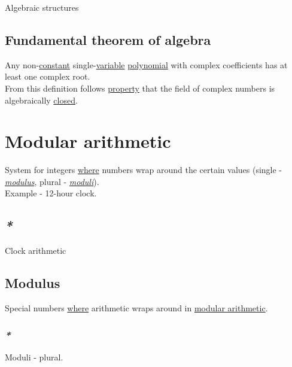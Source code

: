 \documentclass[a4paper,14pt,oneside]{book}
\begin{document}
\label{org011ad83}Algebraic structures\\

\subsection{\label{orgbf66151}Fundamental theorem of algebra}
\label{sec:orgc7f7489}
Any non-\hyperref[org378472e]{constant} single-\hyperref[org2a8e721]{variable} \hyperref[org46adc30]{polynomial} with complex coefficients has at least one complex root.\\

From this definition follows \hyperref[org49b84ac]{property} that the field of complex numbers is algebraically \hyperref[org194c6d7]{closed}.\\

\section{\label{orgf87d4cd}Modular arithmetic}
\label{sec:org1065b7b}
System for integers \hyperref[org12b3f26]{where} numbers wrap around the certain values (single - \emph{\hyperref[org9acab14]{modulus}}, plural - \emph{\hyperref[org7d51c03]{moduli}}).\\

Example - 12-hour clock.\\

\subsection{\emph{*}}
\label{sec:org63f3131}

\label{org0b78cbc}Clock arithmetic\\

\subsection{\label{org9acab14}Modulus}
\label{sec:org92c580f}
Special numbers \hyperref[org12b3f26]{where} arithmetic wraps around in \hyperref[orgf87d4cd]{modular arithmetic}.\\

\subsubsection{\emph{*}}
\label{sec:org93bc4d2}

\label{org7d51c03}Moduli - plural.\\
\end{document}
